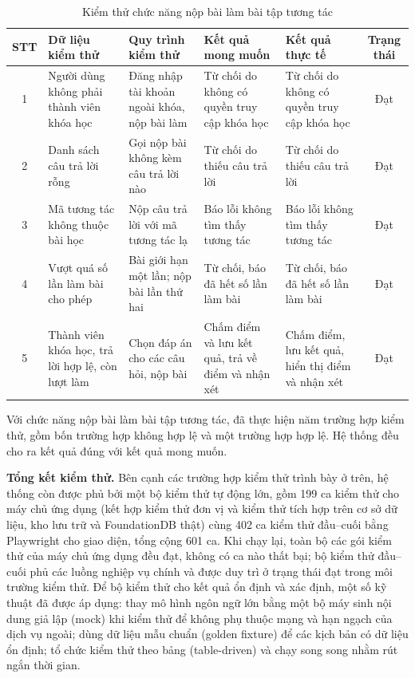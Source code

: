 \documentclass[../DoAn.tex]{subfiles}
\begin{document}
\begin{table}[H]
\centering
\footnotesize
\setlength{\tabcolsep}{4pt}
\begin{tabular}{|c|p{2.2cm}|p{2.9cm}|p{2.7cm}|p{2.7cm}|c|}
\hline
\textbf{STT} & \textbf{Dữ liệu kiểm thử} & \textbf{Quy trình kiểm thử} & \textbf{Kết quả mong muốn} & \textbf{Kết quả thực tế} & \textbf{Trạng thái} \\ \hline
1 & Người dùng không phải thành viên khóa học & Đăng nhập tài khoản ngoài khóa, nộp bài làm & Từ chối do không có quyền truy cập khóa học & Từ chối do không có quyền truy cập khóa học & Đạt \\ \hline
2 & Danh sách câu trả lời rỗng & Gọi nộp bài không kèm câu trả lời nào & Từ chối do thiếu câu trả lời & Từ chối do thiếu câu trả lời & Đạt \\ \hline
3 & Mã tương tác không thuộc bài học & Nộp câu trả lời với mã tương tác lạ & Báo lỗi không tìm thấy tương tác & Báo lỗi không tìm thấy tương tác & Đạt \\ \hline
4 & Vượt quá số lần làm bài cho phép & Bài giới hạn một lần; nộp bài lần thứ hai & Từ chối, báo đã hết số lần làm bài & Từ chối, báo đã hết số lần làm bài & Đạt \\ \hline
5 & Thành viên khóa học, trả lời hợp lệ, còn lượt làm & Chọn đáp án cho các câu hỏi, nộp bài & Chấm điểm và lưu kết quả, trả về điểm và nhận xét & Chấm điểm, lưu kết quả, hiển thị điểm và nhận xét & Đạt \\ \hline
\end{tabular}
\caption{Kiểm thử chức năng nộp bài làm bài tập tương tác}
\label{tbl:test_nopbai}
\end{table}

Với chức năng nộp bài làm bài tập tương tác, đã thực hiện năm trường hợp kiểm thử, gồm bốn trường hợp không hợp lệ và một trường hợp hợp lệ. Hệ thống đều cho ra kết quả đúng với kết quả mong muốn.

\textbf{Tổng kết kiểm thử.} Bên cạnh các trường hợp kiểm thử trình bày ở trên, hệ thống còn được phủ bởi một bộ kiểm thử tự động lớn, gồm 199 ca kiểm thử cho máy chủ ứng dụng (kết hợp kiểm thử đơn vị và kiểm thử tích hợp trên cơ sở dữ liệu, kho lưu trữ và FoundationDB thật) cùng 402 ca kiểm thử đầu--cuối bằng Playwright cho giao diện, tổng cộng 601 ca. Khi chạy lại, toàn bộ các gói kiểm thử của máy chủ ứng dụng đều đạt, không có ca nào thất bại; bộ kiểm thử đầu--cuối phủ các luồng nghiệp vụ chính và được duy trì ở trạng thái đạt trong môi trường kiểm thử. Để bộ kiểm thử cho kết quả ổn định và xác định, một số kỹ thuật đã được áp dụng: thay mô hình ngôn ngữ lớn bằng một bộ máy sinh nội dung giả lập (mock) khi kiểm thử để không phụ thuộc mạng và hạn ngạch của dịch vụ ngoài; dùng dữ liệu mẫu chuẩn (golden fixture) để các kịch bản có dữ liệu ổn định; tổ chức kiểm thử theo bảng (table-driven) và chạy song song nhằm rút ngắn thời gian.
\end{document}
